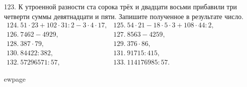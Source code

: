 123. К утроенной разности ста сорока трёх и двадцати восьми прибавили три четверти суммы девятнадцати и пяти. Запишите полученное в результате число.\\
$\begin{array}{lll}
124.\ 51 \cdot 23 + 102 \cdot 31 : 2 - 3 \cdot 4 \cdot 17,& 125.\ 54 \cdot 21 - 18 \cdot 5 \cdot 3 + 108 \cdot 44 : 2,\\
126.\ 7462-4929,& 127.\ 8563-4259,\\
128.\ 387\cdot79,& 129.\ 376\cdot86,\\
130.\ 84422:382,& 131.\ 91715:415,\\
132.\ 57296571 : 57, & 133.\ 114176985 : 57.
\end{array}$

ewpage
